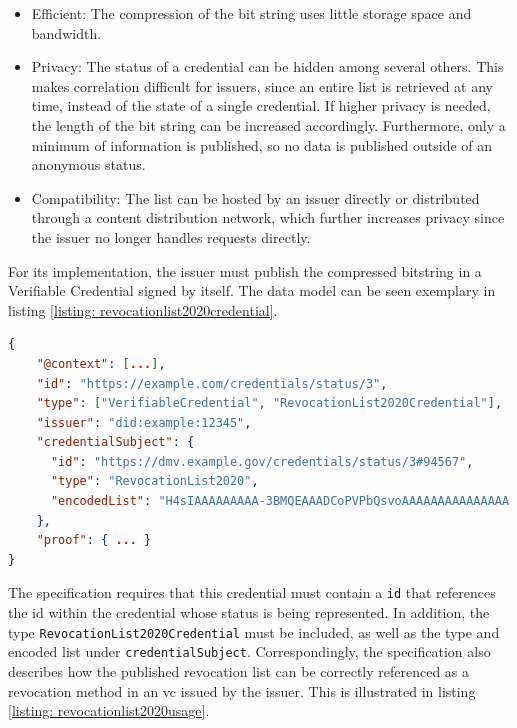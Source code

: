         \begin{itemize}
            \item Efficient: The compression of the bit string uses little storage space and bandwidth.
            \item Privacy: The status of a credential can be hidden among several others. This makes correlation difficult for issuers, since an entire list is retrieved at any time, instead of the state of a single credential. If higher privacy is needed, the length of the bit string can be increased accordingly. Furthermore, only a minimum of information is published, so no data is published outside of an anonymous status. 
            \item Compatibility: The list can be hosted by an issuer directly or distributed through a content distribution network, which further increases privacy since the issuer no longer handles requests directly.
        \end{itemize}
        
        For its implementation, the issuer must publish the compressed bitstring in a Verifiable Credential signed by itself. The data model can be seen exemplary in listing \ref{listing: revocationlist2020credential}.
        \newline

        \begin{lstlisting}[language=json, caption={Example RevocationList2020 credentials (edited and extracted from \cite{longley_revocation_2021})}, captionpos=b, label={listing: revocationlist2020credential}]  
{
    "@context": [...],
    "id": "https://example.com/credentials/status/3", 
    "type": ["VerifiableCredential", "RevocationList2020Credential"],
    "issuer": "did:example:12345", 
    "credentialSubject": {
      "id": "https://dmv.example.gov/credentials/status/3#94567",
      "type": "RevocationList2020",
      "encodedList": "H4sIAAAAAAAAA-3BMQEAAADCoPVPbQsvoAAAAAAAAAAAAAAA..."
    },
    "proof": { ... }
}\end{lstlisting}

        The specification requires that this credential must contain a \texttt{id} that references the id within the credential whose status is being represented.  In addition, the type \texttt{RevocationList2020Credential} must be included, as well as the type and encoded list under \texttt{credentialSubject}. Correspondingly, the specification also describes how the published revocation list can be correctly referenced as a revocation method in an \ac{vc} issued by the issuer. This is illustrated in listing \ref{listing: revocationlist2020usage}.
        \newline
        
